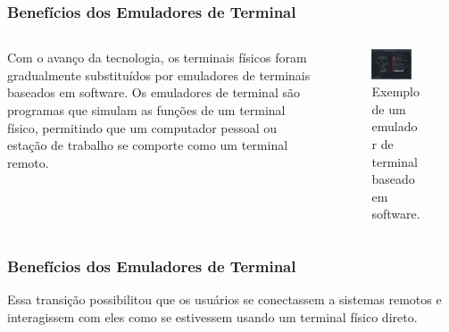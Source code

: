 \documentclass{beamer}
\begin{document}
\begin{frame}\justifying
	\frametitle{Benefícios dos Emuladores de Terminal}


	\begin{columns}\justifying
		\begin{column}{0.6\textwidth}
			Com o avanço da tecnologia, os terminais físicos foram gradualmente substituídos por emuladores de terminais baseados em software. Os emuladores de terminal são programas que simulam as funções de um terminal físico, permitindo que um computador pessoal ou estação de trabalho se comporte como um terminal remoto.
		\end{column}

		\begin{column}{0.4\textwidth}
			\begin{figure}
				\centering
				\includegraphics[width=0.8\textwidth]{assets/aula-tads-pfds/terminal_emulador.png}
				\caption{Exemplo de um emulador de terminal baseado em software.}
			\end{figure}
		\end{column}
	\end{columns}
\end{frame}

\begin{frame}\justifying
	\frametitle{Benefícios dos Emuladores de Terminal}
	Essa transição possibilitou que os usuários se conectassem a sistemas remotos e interagissem com eles como se estivessem usando um terminal físico direto.
\end{frame}
\end{document}
